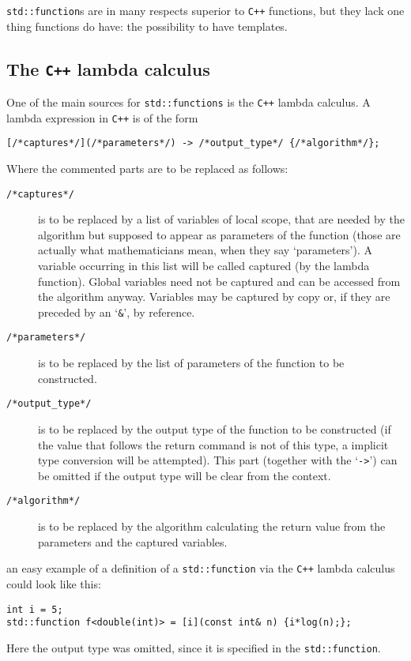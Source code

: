 \documentclass{article}
\newcommand{\cc}{\texttt{C++}\xspace}
\newcommand{\code}[1]{\texttt{#1}}
\begin{document}
\texttt{std::function}s are in many respects superior to \cc functions, but they lack one thing functions do have: the possibility to have templates.


\subsection{The \cc lambda calculus}\label{sec: The cc lambda calculus}

One of the main sources for \texttt{std::functions} is the \cc lambda calculus. A lambda expression in \cc is of the form
\begin{lstlisting}
[/*captures*/](/*parameters*/) -> /*output_type*/ {/*algorithm*/};
\end{lstlisting}
Where the commented parts are to be replaced as follows:
\begin{description}
\item[\textcolor{commentgray}{\code{/*captures*/}}] is to be replaced by a list of variables of local scope, that are needed by the algorithm but supposed to appear as parameters of the function (those are actually what mathematicians mean, when they say \lq parameters\rq). A variable occurring in this list will be called captured (by the lambda function). Global variables need not be captured and can be accessed from the algorithm anyway. Variables may be captured by copy or, if they are preceded by an \lq\texttt{\&}\rq, by reference.
\item[\textcolor{commentgray}{\code{/*parameters*/}}] is to be replaced by the list of parameters of the function to be constructed.
\item[\textcolor{commentgray}{\code{/*output\_type*/}}] is to be replaced by the output type of the function to be constructed (if the value that follows the return command is not of this type, a implicit type conversion will be attempted). This part (together with the \lq\texttt{->}\rq) can be omitted if the output type will be clear from the context.
\item[\textcolor{commentgray}{\code{/*algorithm*/}}] is to be replaced by the algorithm calculating the return value from the parameters and the captured variables.
\end{description}
an easy example of a definition of a \texttt{std::function} via the \cc lambda calculus could look like this:
\begin{lstlisting}
int i = 5;
std::function f<double(int)> = [i](const int& n) {i*log(n);};
\end{lstlisting}
Here the output type was omitted, since it is specified in the \texttt{std::function}.
\end{document}
